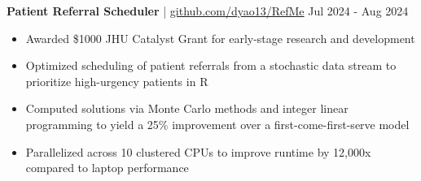 \documentclass[11pt]{article}       %
\begin{document}
\textbf{Patient Referral Scheduler} | \href{https://github.com/dyao13/RefMe}{github.com/dyao13/RefMe} \hfill Jul 2024 - Aug 2024 \vspace{-9pt} \\
\begin{itemize}
  \item Awarded \$1000 JHU Catalyst Grant for early-stage research and development
  \item Optimized scheduling of patient referrals from a stochastic data stream to prioritize high-urgency patients in R
  \item Computed solutions via Monte Carlo methods and integer linear programming to yield a 25\% improvement over a first-come-first-serve model
  \item Parallelized across 10 clustered CPUs to improve runtime by 12,000x compared to laptop performance
\end{itemize}

\vspace{-9pt}
\end{document}
